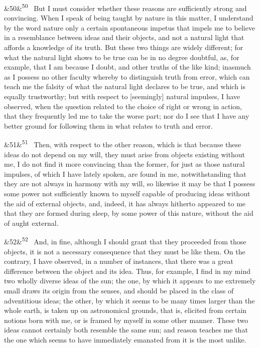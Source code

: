 \documentclass[12pt]{article}
\newcommand{\para}[1][]{\par\noindent\ifx&#1&\else\textsuperscript{\footnotesize #1}~\fi}
\begin{document}
\para[50] But I must consider whether these reasons are sufficiently strong and convincing. When I speak of being taught by nature in this matter, I understand by the word nature only a certain spontaneous impetus that impels me to believe in a resemblance between ideas and their objects, and not a natural light that affords a knowledge of its truth. But these two things are widely different; for what the natural light shows to be true can be in no degree doubtful, as, for example, that I am because I doubt, and other truths of the like kind; inasmuch as I possess no other faculty whereby to distinguish truth from error, which can teach me the falsity of what the natural light declares to be true, and which is equally trustworthy; but with respect to [seemingly] natural impulses, I have observed, when the question related to the choice of right or wrong in action, that they frequently led me to take the worse part; nor do I see that I have any better ground for following them in what relates to truth and error.

\para[51] Then, with respect to the other reason, which is that because these ideas do not depend on my will, they must arise from objects existing without me, I do not find it more convincing than the former, for just as those natural impulses, of which I have lately spoken, are found in me, notwithstanding that they are not always in harmony with my will, so likewise it may be that I possess some power not sufficiently known to myself capable of producing ideas without the aid of external objects, and, indeed, it has always hitherto appeared to me that they are formed during sleep, by some power of this nature, without the aid of aught external.

\para[52] And, in fine, although I should grant that they proceeded from those objects, it is not a necessary consequence that they must be like them. On the contrary, I have observed, in a number of instances, that there was a great difference between the object and its idea. Thus, for example, I find in my mind two wholly diverse ideas of the sun; the one, by which it appears to me extremely small draws its origin from the senses, and should be placed in the class of adventitious ideas; the other, by which it seems to be many times larger than the whole earth, is taken up on astronomical grounds, that is, elicited from certain notions born with me, or is framed by myself in some other manner. These two ideas cannot certainly both resemble the same sun; and reason teaches me that the one which seems to have immediately emanated from it is the most unlike.
\end{document}
